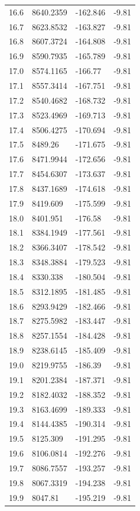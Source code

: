 \begin{table}[H]
\begin{tabular}{llll}
16.6 & 8640.2359 & -162.846 & -9.81 \\
16.7 & 8623.8532 & -163.827 & -9.81 \\
16.8 & 8607.3724 & -164.808 & -9.81 \\
16.9 & 8590.7935 & -165.789 & -9.81 \\
17.0 & 8574.1165 & -166.77 & -9.81 \\
17.1 & 8557.3414 & -167.751 & -9.81 \\
17.2 & 8540.4682 & -168.732 & -9.81 \\
17.3 & 8523.4969 & -169.713 & -9.81 \\
17.4 & 8506.4275 & -170.694 & -9.81 \\
17.5 & 8489.26 & -171.675 & -9.81 \\
17.6 & 8471.9944 & -172.656 & -9.81 \\
17.7 & 8454.6307 & -173.637 & -9.81 \\
17.8 & 8437.1689 & -174.618 & -9.81 \\
17.9 & 8419.609 & -175.599 & -9.81 \\
18.0 & 8401.951 & -176.58 & -9.81 \\
18.1 & 8384.1949 & -177.561 & -9.81 \\
18.2 & 8366.3407 & -178.542 & -9.81 \\
18.3 & 8348.3884 & -179.523 & -9.81 \\
18.4 & 8330.338 & -180.504 & -9.81 \\
18.5 & 8312.1895 & -181.485 & -9.81 \\
18.6 & 8293.9429 & -182.466 & -9.81 \\
18.7 & 8275.5982 & -183.447 & -9.81 \\
18.8 & 8257.1554 & -184.428 & -9.81 \\
18.9 & 8238.6145 & -185.409 & -9.81 \\
19.0 & 8219.9755 & -186.39 & -9.81 \\
19.1 & 8201.2384 & -187.371 & -9.81 \\
19.2 & 8182.4032 & -188.352 & -9.81 \\
19.3 & 8163.4699 & -189.333 & -9.81 \\
19.4 & 8144.4385 & -190.314 & -9.81 \\
19.5 & 8125.309 & -191.295 & -9.81 \\
19.6 & 8106.0814 & -192.276 & -9.81 \\
19.7 & 8086.7557 & -193.257 & -9.81 \\
19.8 & 8067.3319 & -194.238 & -9.81 \\
19.9 & 8047.81 & -195.219 & -9.81 \\

\end{tabular}
\end{table}
